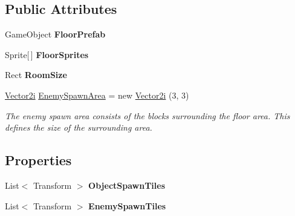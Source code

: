 \subsection*{Public Attributes}
\begin{DoxyCompactItemize}
\item 
\hypertarget{class_round_manager_1_1_environment_a48807fcbcaba6b945990bb68e5448e2c}{}Game\+Object {\bfseries Floor\+Prefab}\label{class_round_manager_1_1_environment_a48807fcbcaba6b945990bb68e5448e2c}

\item 
\hypertarget{class_round_manager_1_1_environment_afbc7d245df23cffaa548dc0259cda3fa}{}Sprite\mbox{[}$\,$\mbox{]} {\bfseries Floor\+Sprites}\label{class_round_manager_1_1_environment_afbc7d245df23cffaa548dc0259cda3fa}

\item 
\hypertarget{class_round_manager_1_1_environment_aa1067665c1fb00a33bc71852e5326b4d}{}Rect {\bfseries Room\+Size}\label{class_round_manager_1_1_environment_aa1067665c1fb00a33bc71852e5326b4d}

\item 
\hyperlink{struct_round_manager_1_1_vector2i}{Vector2i} \hyperlink{class_round_manager_1_1_environment_af13e96cd0aa631187dba6a544bf0e4b1}{Enemy\+Spawn\+Area} = new \hyperlink{struct_round_manager_1_1_vector2i}{Vector2i} (3, 3)
\begin{DoxyCompactList}\small\item\em The enemy spawn area consists of the blocks surrounding the floor area. This defines the size of the surrounding area. \end{DoxyCompactList}\end{DoxyCompactItemize}
\subsection*{Properties}
\begin{DoxyCompactItemize}
\item 
\hypertarget{class_round_manager_1_1_environment_ac26cd9c7946d07574aeabe3bfb1e3247}{}List$<$ Transform $>$ {\bfseries Object\+Spawn\+Tiles}\label{class_round_manager_1_1_environment_ac26cd9c7946d07574aeabe3bfb1e3247}

\item 
\hypertarget{class_round_manager_1_1_environment_a8ac37d7161b0cc3995d3e40f29d28b12}{}List$<$ Transform $>$ {\bfseries Enemy\+Spawn\+Tiles}\label{class_round_manager_1_1_environment_a8ac37d7161b0cc3995d3e40f29d28b12}

\end{DoxyCompactItemize}


